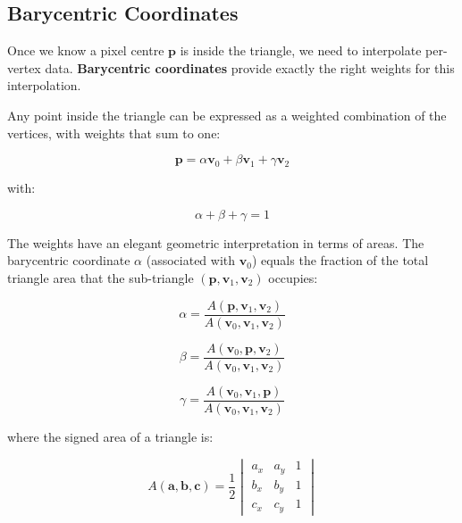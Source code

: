 \documentclass[11pt]{article}
\begin{document}
\subsection{Barycentric Coordinates}

Once we know a pixel centre $\mathbf{p}$ is inside the triangle, we need to interpolate per-vertex data. \textbf{Barycentric coordinates} provide exactly the right weights for this interpolation.

Any point inside the triangle can be expressed as a weighted combination of the vertices, with weights that sum to one:

\begin{equation}
    \mathbf{p} = \alpha \mathbf{v}_0 + \beta \mathbf{v}_1 + \gamma \mathbf{v}_2
\end{equation}

with:

\begin{equation}
    \alpha + \beta + \gamma = 1
\end{equation}

The weights have an elegant geometric interpretation in terms of areas. The barycentric coordinate $\alpha$ (associated with $\mathbf{v}_0$) equals the fraction of the total triangle area that the sub-triangle $(\mathbf{p}, \mathbf{v}_1, \mathbf{v}_2)$ occupies:

\begin{equation}
    \alpha = \frac{A(\mathbf{p}, \mathbf{v}_1, \mathbf{v}_2)}{A(\mathbf{v}_0, \mathbf{v}_1, \mathbf{v}_2)}
\end{equation}

\begin{equation}
    \beta = \frac{A(\mathbf{v}_0, \mathbf{p}, \mathbf{v}_2)}{A(\mathbf{v}_0, \mathbf{v}_1, \mathbf{v}_2)}
\end{equation}

\begin{equation}
    \gamma = \frac{A(\mathbf{v}_0, \mathbf{v}_1, \mathbf{p})}{A(\mathbf{v}_0, \mathbf{v}_1, \mathbf{v}_2)}
\end{equation}

where the signed area of a triangle is:

\begin{equation}
    A(\mathbf{a}, \mathbf{b}, \mathbf{c}) =
    \frac{1}{2}
    \begin{vmatrix}
        a_x & a_y & 1 \\
        b_x & b_y & 1 \\
        c_x & c_y & 1
    \end{vmatrix}
\end{equation}
\end{document}
